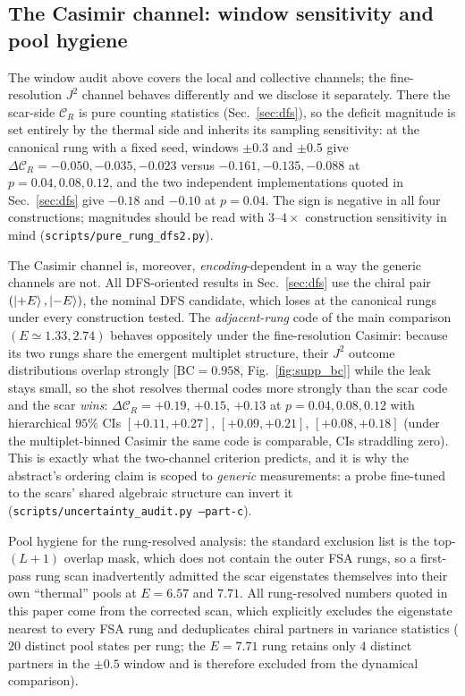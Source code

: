 \documentclass[a4paper,11pt,twocolumn,unpublished]{quantumarticle}
\newcommand{\CR}{\mathcal{C}_R}
\begin{document}
\subsection{The Casimir channel: window sensitivity and pool hygiene}
The window audit above covers the local and collective channels; the
fine-resolution $J^2$ channel behaves differently and we disclose it
separately. There the scar-side $\CR$ is pure counting statistics
(Sec.~\ref{sec:dfs}), so the deficit magnitude is set entirely by the
thermal side and inherits its sampling sensitivity: at the canonical rung
with a fixed seed, windows $\pm0.3$ and $\pm0.5$ give
$\Delta\CR=-0.050,-0.035,-0.023$ versus $-0.161,-0.135,-0.088$ at
$p=0.04,0.08,0.12$, and the two independent implementations quoted in
Sec.~\ref{sec:dfs} give $-0.18$ and $-0.10$ at $p=0.04$. The sign is
negative in all four constructions; magnitudes should be read with
$3$--$4\times$ construction sensitivity in mind
(\texttt{scripts/pure\_rung\_dfs2.py}).

The Casimir channel is, moreover, \emph{encoding}-dependent in a way the
generic channels are not. All DFS-oriented results in
Sec.~\ref{sec:dfs} use the chiral pair $(\ket{+E},\ket{-E})$, the nominal
DFS candidate, which loses at the canonical rungs under every construction
tested. The \emph{adjacent-rung} code of the main comparison
$(E\simeq1.33,2.74)$ behaves oppositely under the fine-resolution Casimir:
because its two rungs share the emergent multiplet structure, their $J^2$
outcome distributions overlap strongly
[$\mathrm{BC}=0.958$, Fig.~\ref{fig:supp_bc}] while the leak stays small,
so the shot resolves thermal codes more strongly than the scar code and the
scar \emph{wins}: $\Delta\CR=+0.19$, $+0.15$, $+0.13$ at $p=0.04,0.08,0.12$
with hierarchical $95\%$ CIs $[+0.11,+0.27]$, $[+0.09,+0.21]$,
$[+0.08,+0.18]$ (under the multiplet-binned Casimir the same code is
comparable, CIs straddling zero). This is exactly what the two-channel
criterion predicts, and it is why the abstract's ordering claim is scoped
to \emph{generic} measurements: a probe fine-tuned to the scars' shared
algebraic structure can invert it
(\texttt{scripts/uncertainty\_audit.py --part-c}).

Pool hygiene for the rung-resolved analysis: the standard exclusion list is
the top-$(L{+}1)$ overlap mask, which does not contain the outer FSA rungs,
so a first-pass rung scan inadvertently admitted the scar eigenstates
themselves into their own ``thermal'' pools at $E=6.57$ and $7.71$. All
rung-resolved numbers quoted in this paper come from the corrected scan,
which explicitly excludes the eigenstate nearest to every FSA rung and
deduplicates chiral partners in variance statistics ($20$ distinct pool
states per rung; the $E=7.71$ rung retains only $4$ distinct partners in
the $\pm0.5$ window and is therefore excluded from the dynamical
comparison).
\end{document}
